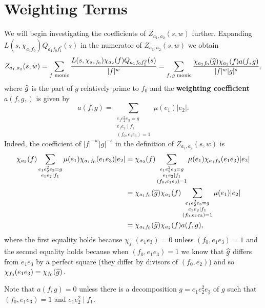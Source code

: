 \documentclass[12pt,reqno,oneside]{amsart}
\begin{document}
\section{Weighting Terms}
    We will begin investigating the coefficients of $Z_{a_{1},a_{2}}(s,w)$ further. Expanding $L(s,\chi_{a_{1}f_{0}})Q_{a_{1}f_{0}f_{1}^{2}}(s)$ in the numerator of $Z_{a_{1},a_{2}}(s,w)$ we obtain
    \[
        Z_{a_{1},a_{2}}(s,w) = \sum_{\text{$f$ monic}}\frac{L(s,\chi_{a_{1}f_{0}})\chi_{a_{2}}(f)Q_{a_{1}f_{0}f_{1}^{2}}(s)}{|f|^{w}} = \sum_{\text{$f,g$ monic}}\frac{\chi_{a_{1}f_{0}}(\widehat{g})\chi_{a_{2}}(f)a(f,g)}{|f|^{w}|g|^{s}},
    \]
    where $\widehat{g}$ is the part of $g$ relatively prime to $f_{0}$ and the \textbf{weighting coefficient} $a(f,g,)$ is given by
    \[
        a(f,g) = \sum_{\substack{e_{1}e_{2}^{2}e_{3} = g \\ e_{1}e_{2} \mid f_{1} \\ (f_{0},e_{1}e_{3}) = 1}}\mu(e_{1})|e_{2}|.
    \]
    Indeed, the coefficient of $|f|^{-w}|g|^{-s}$ in the definition of $Z_{a_{1},a_{2}}(s,w)$ is
    \begin{align*}
        \chi_{a_{2}}(f)\sum_{\substack{e_{1}e_{2}^{2}e_{3} = g \\ e_{1}e_{2} \mid f_{1}}}\mu(e_{1})\chi_{a_{1}f_{0}}(e_{1}e_{3})|e_{2}| &= \chi_{a_{2}}(f)\sum_{\substack{e_{1}e_{2}^{2}e_{3} = g \\ e_{1}e_{2} \mid f_{1} \\ (f_{0},e_{1}e_{3}) = 1}}\mu(e_{1})\chi_{a_{1}f_{0}}(e_{1}e_{3})|e_{2}| \\
        &= \chi_{a_{1}f_{0}}(\widehat{g})\chi_{a_{2}}(f)\sum_{\substack{e_{1}e_{2}^{2}e_{3} = g \\ e_{1}e_{2} \mid f_{1} \\ (f_{0},e_{1}e_{3}) = 1}}\mu(e_{1})|e_{2}| \\
        &= \chi_{a_{1}f_{0}}(\widehat{g})\chi_{a_{2}}(f)a(f,g),
    \end{align*}
    where the first equality holds because $\chi_{f_{0}}(e_{1}e_{3}) = 0$ unless $(f_{0},e_{1}e_{3}) = 1$ and the second equality holds because when $(f_{0},e_{1}e_{3}) = 1$ we know that $\widehat{g}$ differs from $e_{1}e_{3}$ by a perfect square (they differ by divisors of $(f_{0},e_{2})$) and so $\chi_{f_{0}}(e_{1}e_{3}) = \chi_{f_{0}}(\widehat{g})$. 
    
    \begin{remark}\label{rem:weighting_coefficient_remark}
        Note that $a(f,g) = 0$ unless there is a decomposition $g = e_{1}e_{2}^{2}e_{3}$ of $g$ such that $(f_{0},e_{1}e_{3}) = 1$ and $e_{1}e_{2}^{2} \mid f_{1}$.
    \end{remark}
\end{document}
